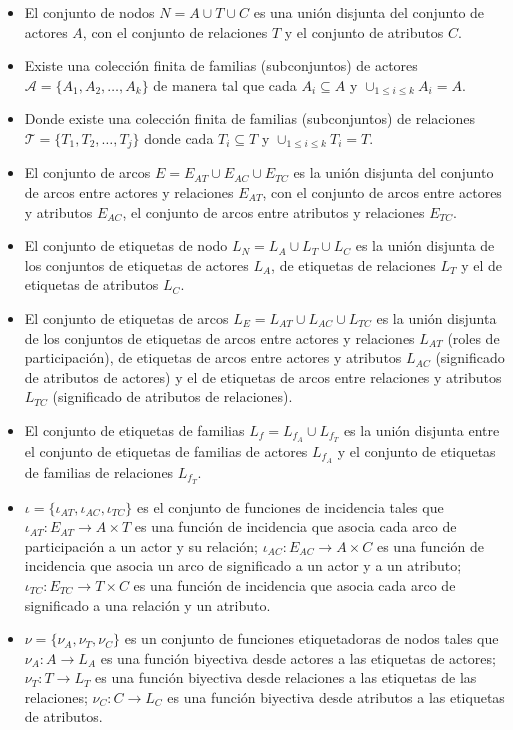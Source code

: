 \begin{defn}
  \begin{itemize}
    \item El conjunto de nodos $N = A \cup T \cup C$ es una unión disjunta del conjunto de actores $A$, con el conjunto de relaciones $T$ y el conjunto de atributos $C$.
    \item Existe una colección finita de familias (subconjuntos) de actores $\mathcal{A} = \{ A_1, A_2, \dotsc, A_k \}$ de manera tal que cada $A_i \subseteq A$ y $\cup_{1 \leq i \leq k}A_i = A$.
    \item Donde existe una colección finita de familias (subconjuntos) de relaciones $\mathcal{T} = \{ T_1, T_2, \dotsc, T_j \}$ donde cada $T_i \subseteq T$ y $\cup_{1 \leq i \leq k}T_i = T$.
    \item El conjunto de arcos $E = E_{AT} \cup E_{AC} \cup E_{TC}$ es la unión disjunta del conjunto de arcos entre actores y relaciones $E_{AT}$, con el conjunto de arcos entre actores y atributos $E_{AC}$, el conjunto de arcos entre atributos y relaciones $E_{TC}$.
    \item El conjunto de etiquetas de nodo $L_N = L_A \cup L_T \cup L_C$ es la unión disjunta de los conjuntos de etiquetas de actores $L_A$, de etiquetas de relaciones $L_T$ y el de etiquetas de atributos $L_C$.
    \item El conjunto de etiquetas de arcos $L_E = L_{AT} \cup L_{AC} \cup L_{TC}$ es la unión disjunta de los conjuntos de etiquetas de arcos entre actores y relaciones $L_{AT}$ (roles de participación), de etiquetas de arcos entre actores y atributos $L_{AC}$ (significado de atributos de actores) y el de etiquetas de arcos entre relaciones y atributos $L_{TC}$ (significado de atributos de relaciones).
    \item El conjunto de etiquetas de familias $L_f = L_{f_A} \cup L_{f_T}$ es la unión disjunta entre el conjunto de etiquetas de familias de actores $L_{f_A}$ y el conjunto de etiquetas de familias de relaciones $L_{f_T}$.
    \item $\iota = \{ \iota_{AT} , \iota_{AC} , \iota_{TC} \}$ es el conjunto de funciones de incidencia tales que $ \iota_{AT} : E_{AT} \longrightarrow A \times T$ es una función de incidencia que asocia cada arco de participación a un actor y su relación; $ \iota_{AC} : E_{AC} \longrightarrow A \times C$ es una función de incidencia que asocia un arco de significado a un actor y a un atributo; $ \iota_{TC} : E_{TC} \longrightarrow T \times C$ es una función de incidencia que asocia cada arco de significado a una relación y un atributo.
    \item $\nu = \{ \nu_A , \nu_T , \nu_C \}$ es un conjunto de funciones etiquetadoras de nodos tales que $ \nu_A : A \longrightarrow L_A$ es una función biyectiva desde actores a las etiquetas de actores; $ \nu_T : T \longrightarrow L_T$ es una función biyectiva desde relaciones a las etiquetas de las relaciones; $ \nu_C : C \longrightarrow L_C$ es una función biyectiva desde atributos a las etiquetas de atributos.

\end{itemize}
\end{defn}
